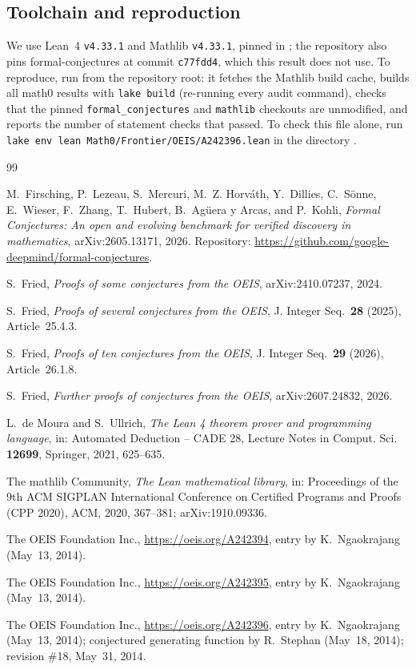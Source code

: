 \documentclass[11pt]{amsart}
\theoremstyle{plain}
\theoremstyle{definition}
\begin{document}
\subsection*{Toolchain and reproduction}
We use Lean~4 \cite{Lean4} \texttt{v4.33.1} and Mathlib \cite{Mathlib} \texttt{v4.33.1}, pinned in ; the repository also pins formal-conjectures \cite{FC} at commit \texttt{c77fdd4}, which this result does not use. To reproduce, run  from the repository root: it fetches the Mathlib build cache, builds all math0 results with \texttt{lake build} (re-running every audit command), checks that the pinned \texttt{formal\_conjectures} and \texttt{mathlib} checkouts are unmodified, and reports the number of statement checks that passed. To check this file alone, run \texttt{lake env lean Math0/Frontier/OEIS/A242396.lean} in the directory .

{\small
\begin{thebibliography}{99}

M.~Firsching, P.~Lezeau, S.~Mercuri, M.~Z. Horv\'ath, Y.~Dillies, C.~S\"onne, E.~Wieser, F.~Zhang, T.~Hubert, B.~Ag\"uera y Arcas, and P.~Kohli, \emph{Formal Conjectures: An open and evolving benchmark for verified discovery in mathematics}, arXiv:2605.13171, 2026. Repository: \url{https://github.com/google-deepmind/formal-conjectures}.

S.~Fried, \emph{Proofs of some conjectures from the OEIS}, arXiv:2410.07237, 2024.

S.~Fried, \emph{Proofs of several conjectures from the OEIS}, J. Integer Seq.\ \textbf{28} (2025), Article~25.4.3.

S.~Fried, \emph{Proofs of ten conjectures from the OEIS}, J. Integer Seq.\ \textbf{29} (2026), Article~26.1.8.

S.~Fried, \emph{Further proofs of conjectures from the OEIS}, arXiv:2607.24832, 2026.

L.~de Moura and S.~Ullrich, \emph{The Lean 4 theorem prover and programming language}, in: Automated Deduction -- CADE 28, Lecture Notes in Comput. Sci. \textbf{12699}, Springer, 2021, 625--635.

The mathlib Community, \emph{The Lean mathematical library}, in: Proceedings of the 9th ACM SIGPLAN International Conference on Certified Programs and Proofs (CPP 2020), ACM, 2020, 367--381; arXiv:1910.09336.

The OEIS Foundation Inc., \url{https://oeis.org/A242394}, entry by K.~Ngaokrajang (May~13, 2014).

The OEIS Foundation Inc., \url{https://oeis.org/A242395}, entry by K.~Ngaokrajang (May~13, 2014).

The OEIS Foundation Inc., \url{https://oeis.org/A242396}, entry by K.~Ngaokrajang (May~13, 2014); conjectured generating function by R.~Stephan (May~18, 2014); revision \#18, May~31, 2014.

\end{thebibliography}
}
\end{document}
